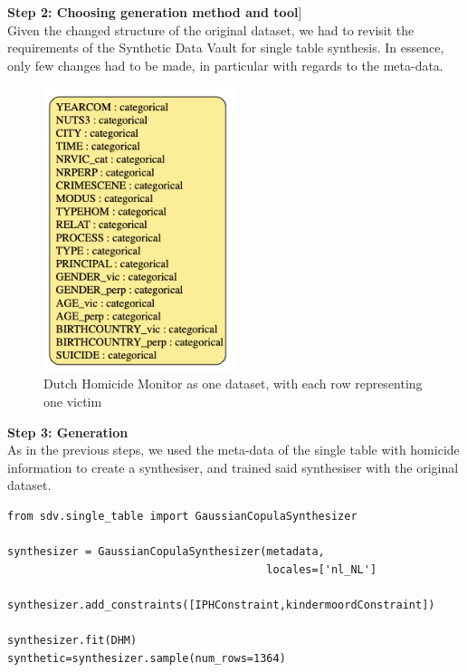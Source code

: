 \textbf{Step 2: Choosing generation method and tool}] \\
Given the changed structure of the original dataset, we had to revisit the requirements of the Synthetic Data Vault for single table synthesis. In essence, only few changes had to be made, in particular with regards to the meta-data.

\vspace{10pt}
\begin{figure}[H]
    \centering  \includegraphics[width=0.5\textwidth]{Images/meta3.png}
    \caption{Dutch Homicide Monitor as one dataset, with each row representing one victim}
    \label{fig:proof_1}
\end{figure}
\vspace{10pt}

\textbf{Step 3: Generation} \\
As in the previous steps, we used the meta-data of the single table with homicide information to create a synthesiser, and trained said synthesiser with the original dataset.

\vspace{10pt}
\begin{lstlisting}[caption={Synthetic Data Generation: Final Attempt}, label={lst:gen_first}]
from sdv.single_table import GaussianCopulaSynthesizer

synthesizer = GaussianCopulaSynthesizer(metadata,
                                        locales=['nl_NL']

synthesizer.add_constraints([IPHConstraint,kindermoordConstraint])

synthesizer.fit(DHM)
synthetic=synthesizer.sample(num_rows=1364)
\end{lstlisting}
\vspace{10pt}

